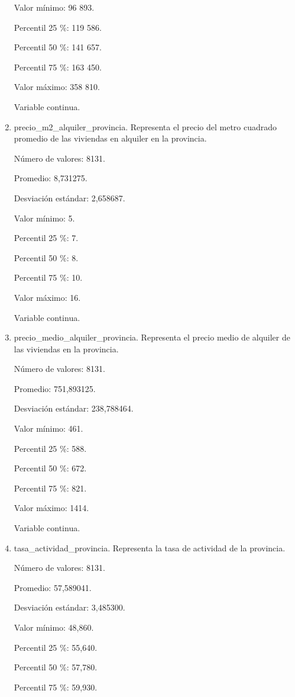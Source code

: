 \begin{enumerate}
	Valor mínimo: 96 893.
	
	Percentil 25 \%: 119 586.
	
	Percentil 50 \%: 141 657.
	
	Percentil 75 \%: 163 450.
	
	Valor máximo: 358 810.
	
	Variable continua.

	\item precio\_m2\_alquiler\_provincia. Representa el precio del metro cuadrado promedio de las viviendas en alquiler en la provincia.
	
	Número de valores: 8131.
	
	Promedio: 8,731275.
	
	Desviación estándar: 2,658687.
	
	Valor mínimo: 5.
	
	Percentil 25 \%: 7.
	
	Percentil 50 \%: 8.
	
	Percentil 75 \%: 10.
	
	Valor máximo: 16.
	
	Variable continua.

	\item precio\_medio\_alquiler\_provincia. Representa el precio medio de alquiler de las viviendas en la provincia.
	
	Número de valores: 8131.
	
	Promedio: 751,893125.
	
	Desviación estándar: 238,788464.
	
	Valor mínimo: 461.
	
	Percentil 25 \%: 588.
	
	Percentil 50 \%: 672.
	
	Percentil 75 \%: 821.
	
	Valor máximo: 1414.
	
	Variable continua.

	\item tasa\_actividad\_provincia. Representa la tasa de actividad de la provincia.
	
	Número de valores: 8131.
	
	Promedio: 57,589041.
	
	Desviación estándar: 3,485300.
	
	Valor mínimo: 48,860.
	
	Percentil 25 \%: 55,640.
	
	Percentil 50 \%: 57,780.
	
	Percentil 75 \%: 59,930.
	

\end{enumerate}
